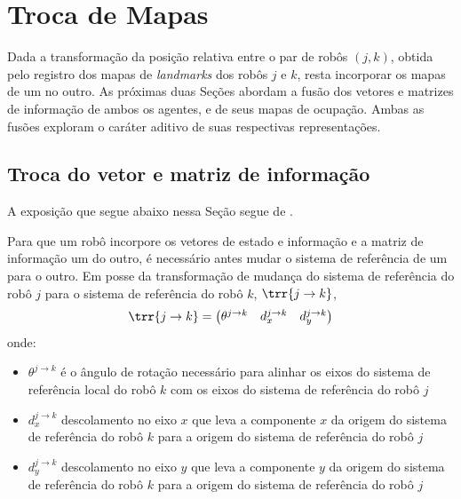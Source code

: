 
\section{Troca de Mapas}
\label{sec:seif-map-exchange}

Dada a transformação da posição relativa entre o par de robôs $(j, k)$, 
obtida pelo registro dos mapas de \textit{landmarks} dos robôs $j$ e 
$k$, resta incorporar os mapas de um no outro. As próximas duas Seções abordam 
a fusão dos vetores e matrizes de informação de ambos os agentes, e de seus 
mapas de ocupação. Ambas as fusões exploram o caráter aditivo de suas 
respectivas representações.

\subsection{Troca do vetor e matriz de informação}
\label{sec:seif-info-exchange}
A exposição que segue abaixo nessa Seção segue de \cite[Seção~12.11]{thrun2005probabilistic}. 

Para que um robô incorpore os vetores de estado e informação e a matriz 
de informação um do outro, é necessário antes mudar o sistema de 
referência de um para o outro. Em posse da transformação de mudança do 
sistema de referência do robô $j$ para o sistema de referência do robô 
$k$, $\trr{j\to k}$, 
\begin{equation}
  \trr{j \to k} = \begin{pmatrix}
    \theta^{j\to k} & d_x^{j\to k} & d_y^{j\to k}
  \end{pmatrix}
\end{equation}
onde:
\begin{itemize}
  \item $\theta^{j\to k}$ é o ângulo de rotação necessário para alinhar 
os eixos do sistema de referência local do robô $k$ com os eixos do 
sistema de referência do robô $j$
  \item $d_x^{j\to k}$ descolamento no eixo $x$ que leva a componente $x$ 
da origem do sistema de referência do robô $k$ para a origem do 
sistema de referência do robô $j$
  \item $d_y^{j\to k}$ descolamento no eixo $y$ que leva a componente $y$ 
da origem do sistema de referência do robô $k$ para a origem do 
sistema de referência do robô $j$
\end{itemize}

